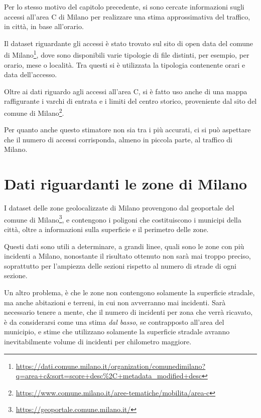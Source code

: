 \documentclass[a4paper,12pt]{report}
\newcommand{\quotestyle}[1]{\textit{#1}}
\begin{document}
Per lo stesso motivo del capitolo precedente, si sono cercate informazioni sugli 
accessi all'area C di Milano per realizzare una stima approssimativa del traffico, in 
città, in base all'orario.

Il dataset riguardante gli accessi è stato trovato sul sito di open data del comune di 
Milano\footnote{\url{https://dati.comune.milano.it/organization/comunedimilano?q=area+c&sort=score+desc\%2C+metadata_modified+desc}}, 
dove sono disponibili varie tipologie di file distinti, per esempio, per orario, 
mese o località. 
Tra questi si è utilizzata la tipologia contenente orari e data dell'accesso.

Oltre ai dati riguardo agli accessi all'area C, si è fatto uso anche di una mappa 
raffigurante i varchi di entrata e i limiti del centro storico, 
proveniente dal sito del comune di 
Milano\footnote{\url{https://www.comune.milano.it/aree-tematiche/mobilita/area-c}}. 

Per quanto anche questo stimatore non sia tra i più accurati, ci si può aspettare che 
il numero di accessi corrisponda, almeno in piccola parte, al traffico di Milano.

\section{Dati riguardanti le zone di Milano}

I dataset delle zone geolocalizzate di Milano provengono dal geoportale del comune di 
Milano\footnote{\url{https://geoportale.comune.milano.it/}}, e contengono i poligoni che 
costituiscono i municipi della città, 
oltre a informazioni sulla superficie e il perimetro delle zone.

Questi dati sono utili a determinare, a grandi linee, quali sono le zone con più incidenti 
a Milano, nonostante il risultato ottenuto non sarà mai troppo preciso, soprattutto 
per l'ampiezza delle sezioni rispetto al numero di strade di ogni sezione.

Un altro problema, è che le zone non contengono solamente la superficie stradale, ma anche 
abitazioni e terreni, in cui non avverranno mai incidenti.
Sarà necessario tenere a mente, che il numero di incidenti per zona che verrà ricavato, 
è da considerarsi come una stima \quotestyle{dal basso}, se contrapposto all'area del municipio, 
e stime che utilizzano solamente la superficie stradale avranno inevitabilmente volume 
di incidenti per chilometro maggiore.
\end{document}
